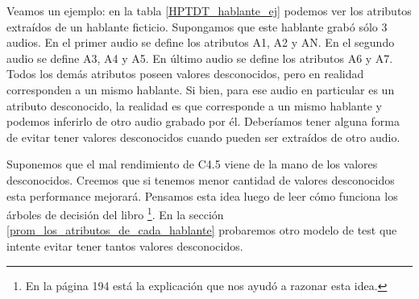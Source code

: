 Veamos un ejemplo: en la tabla \ref{HPTDT_hablante_ej} podemos ver los atributos extraídos de un hablante ficticio. Supongamos que este hablante grabó sólo 3 audios. En el primer audio se define los atributos A1, A2 y AN. En el segundo audio se define A3, A4 y A5. En último audio se define los atributos A6 y A7. Todos los demás atributos poseen valores desconocidos, pero en realidad corresponden a un mismo hablante. Si bien, para ese audio en particular es un atributo desconocido, la realidad es que corresponde a un mismo hablante y podemos inferirlo de otro audio grabado por él. Deberíamos tener alguna forma de evitar tener valores desconocidos cuando pueden ser extraídos de otro audio.

Suponemos que el mal rendimiento de C4.5 viene de la mano de los valores desconocidos. Creemos que si tenemos menor cantidad de valores desconocidos esta performance mejorará. Pensamos esta idea luego de leer cómo funciona los árboles de decisión del libro \cite{DataMining-PracticalMachineLearningTools} \footnote{En la página 194 está la explicación que nos ayudó a razonar esta idea.}. En la sección \ref{prom_los_atributos_de_cada_hablante} probaremos otro modelo de test que intente evitar tener tantos valores desconocidos. 